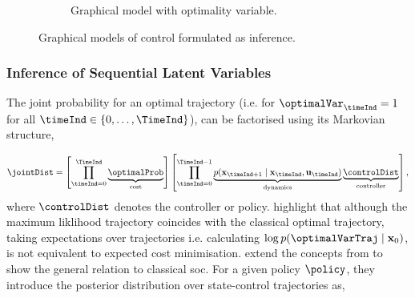 \documentclass{mimosis-class/mimosis}
\numberwithin{equation}{chapter}
\newcommand{\state}{\ensuremath{\mathbf{x}}}
\newcommand{\control}{\ensuremath{\mathbf{u}}}
\begin{document}
{\begin{figure}[t]
\begin{subfigure}{.48\textwidth}
{
    }
  \caption{Graphical model with optimality variable.}
\label{fig-augmented-control-graphical-model}
\end{subfigure}
\caption[Graphical models of control formulated as inference]{Graphical models of control formulated as inference.}
\label{fig-control-graphical-model}
\end{figure}

\subsubsection{Inference of Sequential Latent Variables}
\label{sec:org33e9dc2}
\newline

The joint probability for an optimal trajectory (i.e.
for \(\optimalVar_\timeInd=1\) for all \(\timeInd \in \{0,\ldots,\TimeInd\}\)),
can be factorised using its Markovian structure,

\small
\begin{align} \label{eq-traj-opt-joint-dist}
\jointDist =
\left[ \prod_{\timeInd=0}^{\TimeInd}
\underbrace{\optimalProb}_{\text{cost}} \right]
\left[ \prod_{\timeInd=0}^{\TimeInd-1}
\underbrace{p(\state_{\timeInd+1} \mid \state_\timeInd, \control_\timeInd)}_{\text{dynamics}}
\underbrace{\controlDist}_{\text{controller}} \right],
\end{align}
\normalsize
where \(\controlDist\) denotes the controller or policy.
\cite{toussaintRobot2009} highlight that although the maximum liklihood trajectory coincides with the classical
optimal trajectory, taking expectations over trajectories
i.e. calculating \(\log p(\optimalVarTraj \mid \state_0)\),
is not equivalent to expected cost minimisation.
\cite{rawlikStochastic2013} extend the concepts from  \cite{toussaintRobot2009} to show the general relation
to classical \acrshort{soc}.
For a given policy \(\policy\), they introduce the posterior distribution over state-control trajectories as,

}
\end{document}
